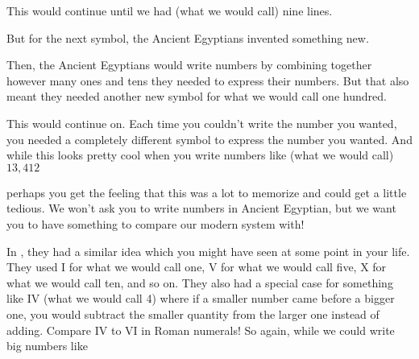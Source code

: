 \documentclass{ximera}
\begin{document}
This would continue until we had (what we would call) nine lines.

\begin{center}
\textpmhg{\Hone} \textpmhg{\Hone} \textpmhg{\Hone} \textpmhg{\Hone} \textpmhg{\Hone} \textpmhg{\Hone} \textpmhg{\Hone} \textpmhg{\Hone} \textpmhg{\Hone}
\end{center}

But for the next symbol, the Ancient Egyptians invented something new.

\begin{center}
\textpmhg{\Hten}
\end{center}

Then, the Ancient Egyptians would write numbers by combining together however many ones and tens they needed to express their numbers. But that also meant they needed another new symbol for what we would call one hundred.

\begin{center}
\textpmhg{\Hhundred}
\end{center}

This would continue on. Each time you couldn't write the number you wanted, you needed a completely different symbol to express the number you wanted. And while this looks pretty cool when you write numbers like (what we would call) $13,412$

\begin{center}
\textpmhg{\HXthousand} \textpmhg{\Hthousand} \textpmhg{\Hthousand} \textpmhg{\Hthousand} \textpmhg{\Hhundred} \textpmhg{\Hhundred} \textpmhg{\Hhundred} \textpmhg{\Hhundred} \textpmhg{\Hten} \textpmhg{\Hone} \textpmhg{\Hone}
\end{center}

perhaps you get the feeling that this was a lot to memorize and could get a little tedious. We won't ask you to write numbers in Ancient Egyptian, but we want you to have something to compare our modern system with!

In , they had a similar idea which you might have seen at some point in your life. They used I for what we would call one, V for what we would call five, X for what we would call ten, and so on. They also had a special case for something like IV (what we would call 4) where if a smaller number came before a bigger one, you would subtract the smaller quantity from the larger one instead of adding. Compare IV to VI in Roman numerals! So again, while we could write big numbers like
\end{document}

